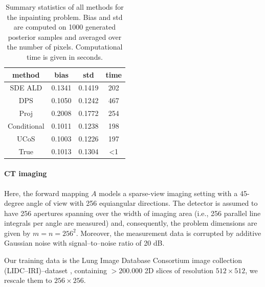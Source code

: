 \documentclass[10pt]{article} %
\theoremstyle{plain}
\theoremstyle{definition}
\theoremstyle{remark}
\begin{document}
\begin{table}
    \centering
    \begin{tabular}{c c c c }
         \centering
             method & bias& std & time\\
             \hline
             SDE ALD& 0.1341 & 0.1419 & 202\\  
             DPS & 0.1050 & 0.1242 & 467 \\
             Proj & 0.2008 & 0.1772 & 254 \\
             Conditional & 0.1011 & 0.1238 & 198 \\
             UCoS & 0.1003 & 0.1226 & 197 \\
             True & 0.1013 & 0.1304 & <1 \\
             \hline
        \end{tabular}
    \caption{Summary statistics of all methods for the inpainting problem. Bias and std are computed on 1000 generated posterior samples and averaged over the number of pixels. Computational time is given in seconds.}
    \label{tab: inpainting}
\end{table}


\paragraph{CT imaging}
Here, the forward mapping $A$ models a sparse-view imaging setting with a 45-degree angle of view with 256 equiangular directions. The detector is assumed to have 256 apertures spanning over the width of imaging area (i.e., 256 parallel line integrals per angle are measured) and, consequently, the problem dimensions are given by $m = n = 256^2$. Moreover, the measurement data is corrupted by additive Gaussian noise with signal--to--noise ratio of 20 dB.

Our training data is the Lung Image Database Consortium image collection (LIDC--IRI)--dataset \cite{armato2015lidc}, containing $>200.000$ 2D slices of resolution $512 \times 512$, we rescale them to $256 \times 256$. 
\end{document}
